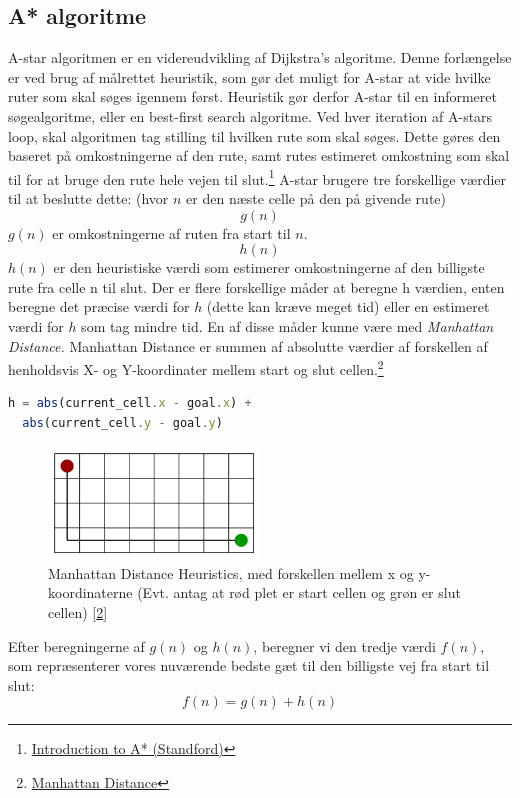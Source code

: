 \documentclass[12pt]{article}
\begin{document}
\subsection{A* algoritme}
A-star algoritmen er en videreudvikling af Dijkstra’s algoritme. Denne forlængelse er ved brug af målrettet heuristik, 
som gør det muligt for A-star at vide hvilke ruter som skal søges igennem først. 
Heuristik gør derfor A-star til en informeret søgealgoritme, eller en best-first search algoritme. 
Ved hver iteration af A-stars loop, skal algoritmen tag stilling til hvilken rute som skal søges. Dette gøres den baseret på omkostningerne af den rute, samt rutes estimeret omkostning som skal til for at bruge den rute hele vejen til slut.\footnote{\href{http://theory.stanford.edu/~amitp/GameProgramming/AStarComparison.html}{Introduction to A* (Standford)}} A-star brugere tre forskellige værdier til at beslutte dette: 
(hvor $n$ er den næste celle på den på givende rute)\\
\[g(n)\]
$g(n)$  er omkostningerne af ruten fra start til $n$.
\[h(n)\] 
$h(n)$ er den heuristiske værdi som estimerer omkostningerne af den billigste rute fra celle n til slut. 
Der er flere forskellige måder at beregne h værdien, enten beregne det præcise værdi for $h$ (dette kan kræve meget tid) eller en estimeret værdi for $h$ som tag mindre tid. En af disse måder kunne være med \textit{Manhattan Distance.} 
Manhattan Distance er summen af absolutte værdier af forskellen af henholdsvis X- og Y-koordinater mellem start og slut cellen.\footnote{\href{https://www.geeksforgeeks.org/a-search-algorithm/}{Manhattan Distance}\label{footnote:Manhattan}}
\begin{lstlisting}[language=JavaScript, caption=Manhattan Distance\label{code:Manhattan}]
  h = abs(current_cell.x - goal.x) + 
  abs(current_cell.y - goal.y)
\end{lstlisting}
\begin{figure}[ht]\label{fig:Manhattan}
  \centering
  \includegraphics[width=0.50\textwidth]{../manhattan.png}
  \caption{Manhattan Distance Heuristics, med forskellen mellem x og y-koordinaterne (Evt. antag at rød plet er start cellen og grøn er slut cellen) [\ref{footnote:Manhattan}]}
\end{figure}
Efter beregningerne af $g(n)$ og $h(n)$, beregner vi den tredje værdi $f(n)$, 
som repræsenterer vores nuværende bedste gæt til den billigste vej fra start til slut:
\[f(n)= g(n) + h(n)\]
\end{document}
